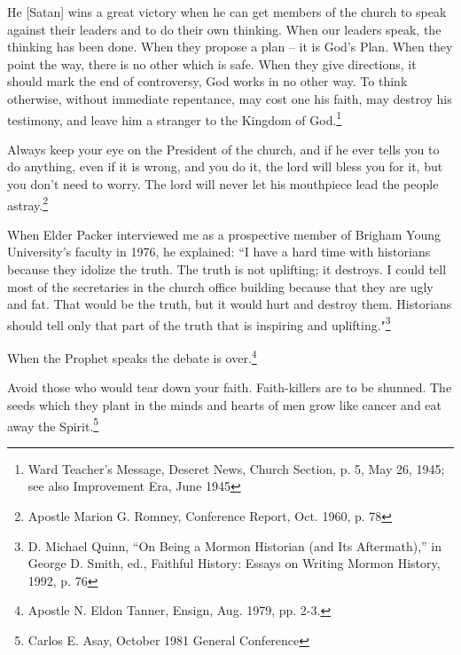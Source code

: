 \begin{displayquote}
He [Satan] wins a great victory when he can get members of the church to speak
against their leaders and to do their own thinking. When our leaders speak, the
thinking has been done. When they propose a plan – it is God's Plan. When they point
the way, there is no other which is safe. When they give directions, it should mark
the end of controversy, God works in no other way. To think otherwise, without 
immediate repentance, may cost one his faith, may destroy his testimony, and leave 
him a stranger to the Kingdom of God.\footnote{
Ward Teacher's Message, Deseret News, Church Section, p. 5, May 26, 1945; see also 
Improvement Era, June 1945
}
\end{displayquote}

\begin{displayquote}
Always keep your eye on the President of the church, and if he ever tells you to do
anything, even if it is wrong, and you do it, the lord will bless you for it, but you
don't need to worry. The lord will never let his mouthpiece lead the people
astray.\footnote{Apostle Marion G. Romney, Conference Report, Oct. 1960, p. 78}
\end{displayquote}

\begin{displayquote}
When Elder Packer interviewed me as a prospective member of Brigham Young
University's faculty in 1976, he explained: ``I have a hard time with historians
because they idolize the truth. The truth is not uplifting; it destroys. I could tell
most of the secretaries in the church office building because that they are ugly and
fat. That would be the truth, but it would hurt and destroy them. Historians should
tell only that part of the truth that is inspiring and uplifting."\footnote{
D. Michael Quinn, “On Being a Mormon Historian (and Its Aftermath),” in George D. 
Smith, ed., Faithful History: Essays on Writing Mormon History, 1992, p. 76
}
\end{displayquote}

\begin{displayquote}
When the Prophet speaks the debate is over.\footnote{Apostle N. Eldon Tanner, 
Ensign, Aug. 1979, pp. 2-3.}
\end{displayquote}

\begin{displayquote}
Avoid those who would tear down your faith. Faith-killers are to be shunned. The
seeds which they plant in the minds and hearts of men grow like cancer and eat
away the Spirit.\footnote{Carlos E. Asay, October 1981 General Conference}
\end{displayquote}

